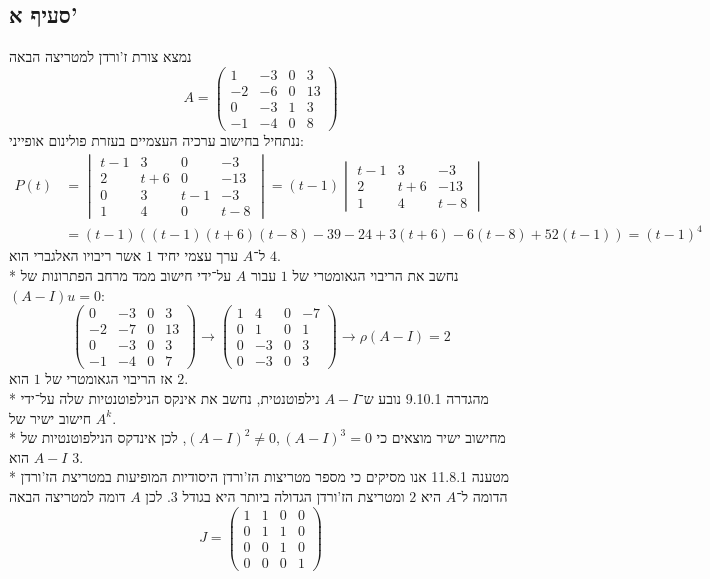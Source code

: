 \subsection{סעיף א'}
נמצא צורת ז'ורדן למטריצה הבאה
\[
	A = \begin{pmatrix}
		1 & -3 & 0 & 3 \\
		-2 & -6 & 0 & 13 \\
		0 & -3 & 1 & 3 \\
		-1 & -4 & 0 & 8
	\end{pmatrix}
\]
ננתחיל בחישוב ערכיה העצמיים בעזרת פולינום אופייני:
\begin{align*}
	P(t)
	& = \begin{vmatrix}
		t - 1 & 3 & 0 & -3 \\
		2 & t + 6 & 0 & -13 \\
		0 & 3 & t - 1 & -3 \\
		1 & 4 & 0 & t - 8
	\end{vmatrix}
	= (t - 1) \begin{vmatrix}
		t - 1 & 3 & -3 \\
		2 & t + 6 & -13 \\
		1 & 4 & t - 8
	\end{vmatrix} \\
	& = (t - 1) ((t -1) (t + 6) (t - 8) - 39 - 24 + 3 (t + 6) - 6 (t - 8) + 52 (t - 1)) = {(t - 1)}^4
\end{align*}
ל־$A$ ערך עצמי יחיד $1$ אשר ריבויו האלגברי הוא $4$. \\*
נחשב את הריבוי הגאומטרי של $1$ עבור $A$ על־ידי חישוב ממד מרחב הפתרונות של $(A - I) u = 0$:
\[
	\begin{pmatrix}
		0 & -3 & 0 & 3 \\
		-2 & -7 & 0 & 13 \\
		0 & -3 & 0 & 3 \\
		-1 & -4 & 0 & 7
	\end{pmatrix}
	\rightarrow
	\begin{pmatrix}
		1 & 4 & 0 & -7 \\
		0 & 1 & 0 & 1 \\
		0 & -3 & 0 & 3 \\
		0 & -3 & 0 & 3
	\end{pmatrix}
	\rightarrow \rho (A - I) = 2
\]
אז הריבוי הגאומטרי של $1$ הוא $2$. \\*
מהגדרה 9.10.1 נובע ש־$A - I$ נילפוטנטית, נחשב את אינקס הנילפוטנטיות שלה על־ידי חישוב ישיר של $A^k$. \\*
מחישוב ישיר מוצאים כי ${(A - I)}^2 \ne 0, {(A - I)}^3 = 0$, לכן אינדקס הנילפוטנטיות של $A - I$ הוא $3$. \\*
מטענה 11.8.1 אנו מסיקים כי מספר מטריצות הז'ורדן היסודיות המופיעות במטריצת הז'ורדן הדומה ל־$A$ היא $2$ ומטריצת הז'ורדן הגדולה ביותר היא בגודל $3$.
לכן $A$ דומה למטריצה הבאה
\[
	J = \begin{pmatrix}
		1 & 1 & 0 & 0 \\
		0 & 1 & 1 & 0 \\
		0 & 0 & 1 & 0 \\
		0 & 0 & 0 & 1
	\end{pmatrix}
\]

